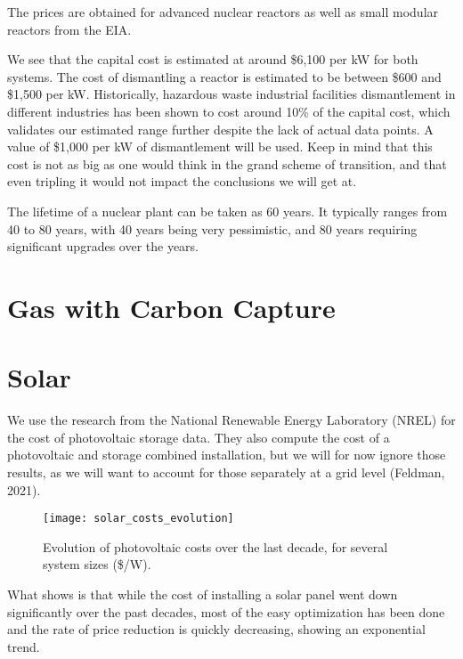 The prices are obtained for advanced nuclear reactors as well as small modular reactors from the EIA. 

We see that the capital cost is estimated at around \$6,100 per kW for both systems. The cost of dismantling a reactor is estimated to be between \$600 and \$1,500 per kW. Historically, hazardous waste industrial facilities dismantlement in different industries has been shown to cost around 10\% of the capital cost, which validates our estimated range further despite the lack of actual data points. A value of \$1,000 per kW of dismantlement will be used. Keep in mind that this cost is not as big as one would think in the grand scheme of transition, and that even tripling it would not impact the conclusions we will get at.

The lifetime of a nuclear plant can be taken as 60 years. It typically ranges from 40 to 80 years, with 40 years being very pessimistic, and 80 years requiring significant upgrades over the years.


\section{Gas with Carbon Capture}

\blindtext


\section{Solar}

We use the research from the National Renewable Energy Laboratory (NREL) for the cost of photovoltaic storage data. They also compute the cost of a photovoltaic and storage combined installation, but we will for now ignore those results, as we will want to account for those separately at a grid level (Feldman, 2021).


\begin{figure}[hb]
	\texttt{[image: solar\_costs\_evolution]}
	\caption[Evolution of photovoltaic costs over the last decade, for several system sizes (\$/W)]{Evolution of photovoltaic costs over the last decade, for several system sizes (\$/W).}
\end{figure}

What  shows is that while the cost of installing a solar panel went down significantly over the past decades, most of the easy optimization has been done and the rate of price reduction is quickly decreasing, showing an exponential trend.

